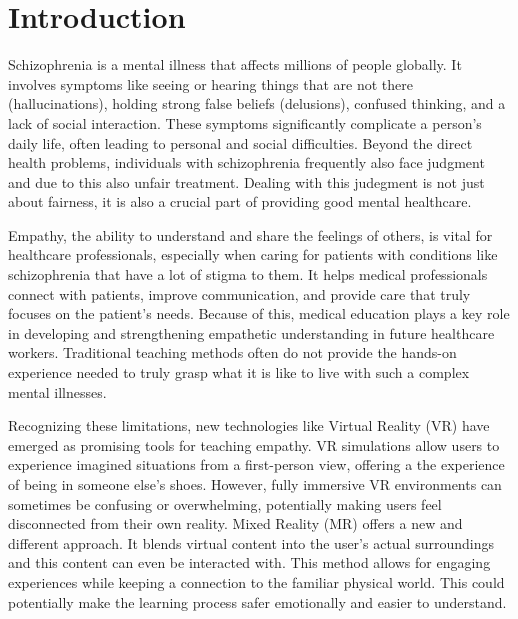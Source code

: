 \chapter{Introduction}
\label{ch:introduction}


Schizophrenia is a mental illness that affects millions of people globally. It involves symptoms like seeing or hearing things that are not there (hallucinations), holding strong false beliefs (delusions), confused thinking, and a lack of social interaction. These symptoms significantly complicate a person's daily life, often leading to personal and social difficulties. Beyond the direct health problems, individuals with schizophrenia frequently also face judgment and due to this also unfair treatment. Dealing with this judegment is not just about fairness, it is also a crucial part of providing good mental healthcare.

\vspace{1em}

Empathy, the ability to understand and share the feelings of others, is vital for healthcare professionals, especially when caring for patients with conditions like schizophrenia that have a lot of stigma to them. It helps medical professionals connect with patients, improve communication, and provide care that truly focuses on the patient's needs. Because of this, medical education plays a key role in developing and strengthening empathetic understanding in future healthcare workers. Traditional teaching methods often do not provide the hands-on experience needed to truly grasp what it is like to live with such a complex mental illnesses.

\vspace{1em}

Recognizing these limitations, new technologies like Virtual Reality (VR) have emerged as promising tools for teaching empathy. VR simulations allow users to experience imagined situations from a first-person view, offering a the experience of being in someone else's shoes. However, fully immersive VR environments can sometimes be confusing or overwhelming, potentially making users feel disconnected from their own reality. Mixed Reality (MR) offers a new and different approach. It blends virtual content into the user's actual surroundings and this content can even be interacted with. This method allows for engaging experiences while keeping a connection to the familiar physical world. This could potentially make the learning process safer emotionally and easier to understand.

